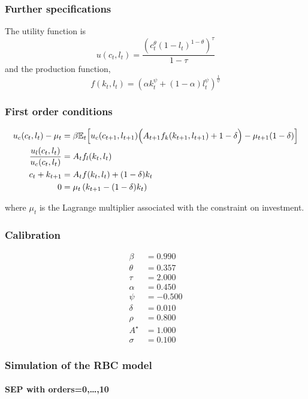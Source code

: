 \documentclass{beamer}
\begin{document}
\begin{frame}
\frametitle{Further specifications}
The utility function is
\[
  u(c_t,l_t) = \frac{\left(c_t^{\theta}(1-l_t)^{1-\theta}\right)^{\tau}}{1-\tau}
\]
and the production function,
\[
  f(k_{t},l_t) = \left(\alpha k_{t}^{\psi} + (1-\alpha)l_t^{\psi}\right)^{\frac{1}{\psi}}
\]
\end{frame}

\begin{frame}
\frametitle{First order conditions}
{\footnotesize\[
\begin{split}
  u_c(c_t,l_t) - \mu_t &= \beta \mathbb E_t\Big[
    u_c(c_{t+1},l_{t+1})\Bigl(A_{t+1}f_k(k_{t+1},l_{t+1}) + 1
    -\delta\Bigr) - \mu_{t+1}(1-\delta)\Big]\\
  \frac{u_{l}(c_t,l_t)}{u_c(c_t,l_t)} &= A_tf_l(k_t,l_t)\\
  c_t + k_{t+1} &= A_tf(k_{t},l_t) + (1-\delta)k_{t}\\
  0 &= \mu_t \left( k_{t+1} - (1-\delta)k_{t} \right)
\end{split}
\]}

\bigskip\bigskip

where $\mu_t$ is the Lagrange multiplier associated with the constraint on investment.
\end{frame}

\begin{frame}
  \frametitle{Calibration}
  \begin{align*}
    \beta    &=  0.990\\
    \theta   &=  0.357\\
    \tau     &=  2.000\\
    \alpha   &=  0.450\\
    \psi     &= -0.500\\
    \delta   &=  0.010\\
    \rho     &=  0.800\\
    A^\star &=  1.000\\
    \sigma   &=  0.100
  \end{align*}
\end{frame}


\begin{frame}
    \frametitle{Simulation of the RBC model}
    \framesubtitle{SEP with orders=0,\dots,10}
  \begin{center}
    \scalebox{.5}{
  }
  \end{center}

\end{frame}
\end{document}
